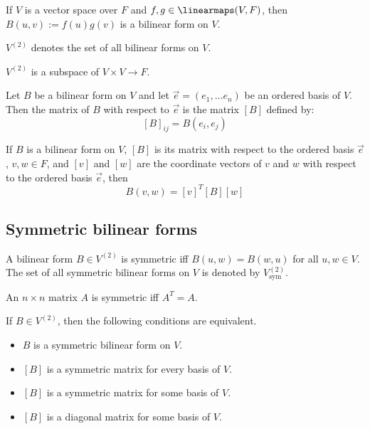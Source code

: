 \begin{lemma}
  If $V$ is a vector space over $F$ and $f, g \in \linearmaps(V, F)$, then $B(u, v) := f(u) g(v)$ is a bilinear form on $V$.
\end{lemma}

\begin{definition}
  $V^{(2)}$ denotes the set of all bilinear forms on $V$.
\end{definition}

\begin{lemma}
  $V^{(2)}$ is a subspace of $V \times V \to F$.
\end{lemma}

\begin{definition}
  Let $B$ be a bilinear form on $V$ and let $\vec{e} = (e_1, \ldots e_n)$ be an ordered basis of $V$. Then the matrix of $B$ with respect to $\vec{e}$ is the matrix $[B]$ defined by:
  \[
    [B]_{ij} = B(e_i, e_j)
  \]
\end{definition}

\begin{theorem}
  If $B$ is a bilinear form on $V$, $[B]$ is its matrix with respect to the ordered basis $\vec{e}$, $v, w \in F$, and $[v]$ and $[w]$ are the coordinate vectors of $v$ and $w$ with respect to the ordered basis $\vec{e}$, then
  \[
    B(v, w) = [v]^T [B] [w]
  \]
\end{theorem}

\subsection{Symmetric bilinear forms}

\begin{definition}
  A bilinear form $B \in V^{(2)}$ is symmetric iff $B(u, w) = B(w, u)$ for all $u, w \in V$. The set of all symmetric bilinear forms on $V$ is denoted by $V^{(2)}_{\text{sym}}$.
\end{definition}

\begin{definition}
  An $n \times n$ matrix $A$ is symmetric iff $A^T = A$.
\end{definition}

\begin{theorem}
  If $B \in V^{(2)}$, then the following conditions are equivalent.
  \begin{itemize}
    \item $B$ is a symmetric bilinear form on $V$.
    \item $[B]$ is a symmetric matrix for every basis of $V$.
    \item $[B]$ is a symmetric matrix for some basis of $V$.
    \item $[B]$ is a diagonal matrix for some basis of $V$.
  \end{itemize}
\end{theorem}

